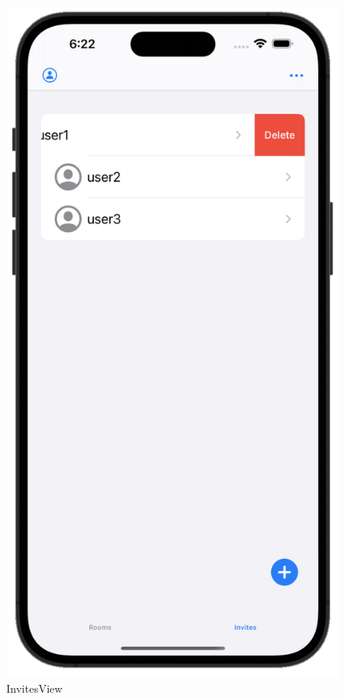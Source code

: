     \begin{figure}[h]
        \includegraphics[scale=0.5]{invites_white}
        \centering
        \caption{InvitesView}\label{fig:invitesview}
    \end{figure}

